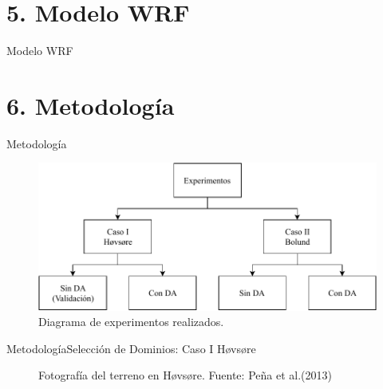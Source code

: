 \documentclass[mathserif,10pt]{beamer}
\begin{document}
\section{5. Modelo WRF}
\begin{frame}{Modelo WRF}
\end{frame}










\section{6. Metodología}
\begin{frame}{Metodología}
	\begin{figure}[h!]
		\centering
		\includegraphics[width=1\linewidth,clip]{tesis_experimentos}
		\caption{Diagrama de experimentos realizados.}
	\end{figure}
\end{frame}
\begin{frame}{Metodología}{Selección de Dominios: Caso I Høvsøre}
	 \begin{figure}[H]
	 	\centering{}%
	 	\caption{Fotografía del terreno en Høvsøre. Fuente: Peña et al.(2013)}
	 	\label{fig:05_terreno_hovsore}
	 \end{figure}
\end{frame}
\end{document}
